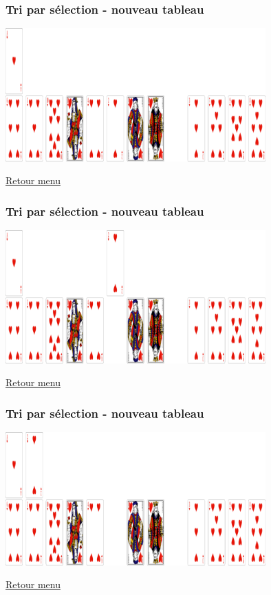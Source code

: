 \documentclass[svgnames,11pt]{beamer}
\begin{document}
\begin{frame}
    \frametitle{Tri par sélection - nouveau tableau}

    \begin{center}
        \centering
        \includegraphics[width=10cm]{ressources/selection2-2.png}
        \label{pique}
    \end{center}
    \hyperlink{menu}{Retour menu}

\end{frame}

\begin{frame}
    \frametitle{Tri par sélection - nouveau tableau}

    \begin{center}
        \centering
        \includegraphics[width=10cm]{ressources/selection2-3.png}
        \label{pique}
    \end{center}
    \hyperlink{menu}{Retour menu}

\end{frame}

\begin{frame}
    \frametitle{Tri par sélection - nouveau tableau}

    \begin{center}
        \centering
        \includegraphics[width=10cm]{ressources/selection2-4.png}
        \label{pique}
    \end{center}
    \hyperlink{menu}{Retour menu}

\end{frame}
\end{document}
